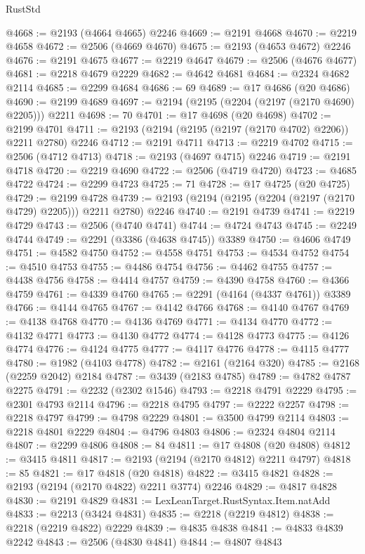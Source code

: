 \begin{lexlean}{RustStd}
\begin{coremodule}
{\begin{coremodule}
{{{{{{{{{{{{{{{{{{{{{{{{{{@4668 := @2193 (@4664 @4665) @2246
@4669 := @2191 @4668
@4670 := @2219 @4658
@4672 := @2506 (@4669 @4670)
@4675 := @2193 (@4653 @4672) @2246
@4676 := @2191 @4675
@4677 := @2219 @4647
@4679 := @2506 (@4676 @4677)
@4681 := @2218 @4679 @2229
@4682 := @4642 @4681
@4684 := @2324 @4682 @2114
@4685 := @2299 @4684
@4686 := 69
@4689 := @17 @4686 (@20 @4686)
@4690 := @2199 @4689
@4697 := @2194 (@2195 (@2204 (@2197 (@2170 @4690) @2205))) @2211
@4698 := 70
@4701 := @17 @4698 (@20 @4698)
@4702 := @2199 @4701
@4711 := @2193 (@2194 (@2195 (@2197 (@2170 @4702) @2206)) @2211 @2780) @2246
@4712 := @2191 @4711
@4713 := @2219 @4702
@4715 := @2506 (@4712 @4713)
@4718 := @2193 (@4697 @4715) @2246
@4719 := @2191 @4718
@4720 := @2219 @4690
@4722 := @2506 (@4719 @4720)
@4723 := @4685 @4722
@4724 := @2299 @4723
@4725 := 71
@4728 := @17 @4725 (@20 @4725)
@4729 := @2199 @4728
@4739 := @2193 (@2194 (@2195 (@2204 (@2197 (@2170 @4729) @2205))) @2211 @2780) @2246
@4740 := @2191 @4739
@4741 := @2219 @4729
@4743 := @2506 (@4740 @4741)
@4744 := @4724 @4743
@4745 := @2249 @4744
@4749 := @2291 (@3386 (@4638 @4745)) @3389
@4750 := @4606 @4749
@4751 := @4582 @4750
@4752 := @4558 @4751
@4753 := @4534 @4752
@4754 := @4510 @4753
@4755 := @4486 @4754
@4756 := @4462 @4755
@4757 := @4438 @4756
@4758 := @4414 @4757
@4759 := @4390 @4758
@4760 := @4366 @4759
@4761 := @4339 @4760
@4765 := @2291 (@4164 (@4337 @4761)) @3389
@4766 := @4144 @4765
@4767 := @4142 @4766
@4768 := @4140 @4767
@4769 := @4138 @4768
@4770 := @4136 @4769
@4771 := @4134 @4770
@4772 := @4132 @4771
@4773 := @4130 @4772
@4774 := @4128 @4773
@4775 := @4126 @4774
@4776 := @4124 @4775
@4777 := @4117 @4776
@4778 := @4115 @4777
@4780 := @1982 (@4103 @4778)
@4782 := @2161 (@2164 @320)
@4785 := @2168 (@2259 @2042) @2184
@4787 := @3439 (@2183 @4785)
@4789 := @4782 @4787 @2275
@4791 := @2232 (@2302 @1546)
@4793 := @2218 @4791 @2229
@4795 := @2301 @4793 @2114
@4796 := @2218 @4795
@4797 := @2222 @2257
@4798 := @2218 @4797
@4799 := @4798 @2229
@4801 := @3500 @4799 @2114
@4803 := @2218 @4801 @2229
@4804 := @4796 @4803
@4806 := @2324 @4804 @2114
@4807 := @2299 @4806
@4808 := 84
@4811 := @17 @4808 (@20 @4808)
@4812 := @3415 @4811
@4817 := @2193 (@2194 (@2170 @4812) @2211 @4797)
@4818 := 85
@4821 := @17 @4818 (@20 @4818)
@4822 := @3415 @4821
@4828 := @2193 (@2194 (@2170 @4822) @2211 @3774) @2246
@4829 := @4817 @4828
@4830 := @2191 @4829
@4831 := LexLeanTarget.RustSyntax.Item.natAdd
@4833 := @2213 (@3424 @4831)
@4835 := @2218 (@2219 @4812)
@4838 := @2218 (@2219 @4822) @2229
@4839 := @4835 @4838
@4841 := @4833 @4839 @2242
@4843 := @2506 (@4830 @4841)
@4844 := @4807 @4843
}}}}}}}}}}}}}}}}}}}}}}}}}}
\end{coremodule}}
\end{coremodule}
\end{lexlean}

